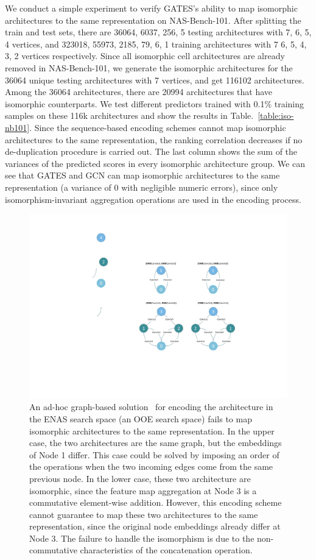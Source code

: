 \documentclass[runningheads]{llncs}
\begin{document}
We conduct a simple experiment to verify GATES's ability to map isomorphic architectures to the same representation on NAS-Bench-101.
After splitting the train and test sets, there are 36064, 6037, 256, 5 testing architectures with 7, 6, 5, 4 vertices, and 323018, 55973, 2185, 79, 6, 1 training architectures with 7 6, 5, 4, 3, 2 vertices respectively.
Since all isomorphic cell architectures are already removed in NAS-Bench-101, we generate the isomorphic architectures for the 36064 unique testing architectures with 7 vertices, and get 116102 architectures. Among the 36064 architectures, there are 20994 architectures that have isomorphic counterparts. We test different predictors trained with 0.1\% training samples on these 116k architectures and show the results in Table.~\ref{table:iso-nb101}. Since the sequence-based encoding schemes cannot map isomorphic architectures to the same representation, the ranking correlation decreases if no de-duplication procedure is carried out. The last column shows the sum of the variances of the predicted scores in every isomorphic architecture group. We can see that GATES and GCN can map isomorphic architectures to the same representation (a variance of 0 with negligible numeric errors), since only isomorphism-invariant aggregation operations are used in the encoding process.


\begin{figure}[tb]
\begin{center}
\includegraphics[width=0.64\linewidth]{figs/counter_new.pdf}
\caption{An ad-hoc graph-based solution~\cite{guo2019nat} for encoding the architecture in the ENAS search space (an OOE search space) fails to map isomorphic architectures to the same representation. In the upper case, the two architectures are the same graph, but the embeddings of Node 1 differ. This case could be solved by imposing an order of the operations when the two incoming edges come from the same previous node. In the lower case, these two architecture are isomorphic, since the feature map aggregation at Node 3 is a commutative element-wise addition. However, this encoding scheme cannot guarantee to map these two architectures to the same representation, since the original node embeddings already differ at Node 3. The failure to handle the isomorphism is due to the non-commutative characteristics of the concatenation operation.}
\label{fig:guo_gcn_counter_example}
\end{center}
\end{figure}
\end{document}
